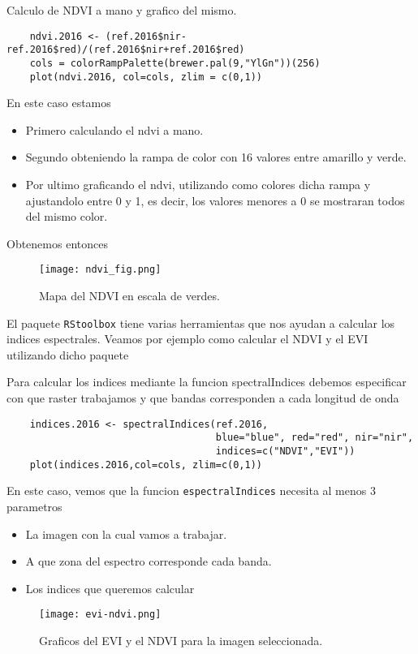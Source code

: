 \begin{exa}
    Calculo de NDVI a mano y grafico del mismo. 
    \begin{lstlisting}
    ndvi.2016 <- (ref.2016$nir-ref.2016$red)/(ref.2016$nir+ref.2016$red)
    cols = colorRampPalette(brewer.pal(9,"YlGn"))(256)
    plot(ndvi.2016, col=cols, zlim = c(0,1))
    \end{lstlisting}
    En este caso estamos
    \begin{itemize}
        \item Primero calculando el ndvi a mano.
        \item Segundo obteniendo la rampa de color con 16 valores entre amarillo
            y verde.
        \item Por ultimo graficando el ndvi, utilizando como colores dicha rampa
            y ajustandolo entre 0 y 1, es decir, los valores menores a 0 se
            mostraran todos del mismo color.
    \end{itemize}
    Obtenemos entonces
    \begin{figure}
    \begin{center}
        \texttt{[image: ndvi\_fig.png]}
    \end{center}
    \caption{Mapa del NDVI en escala de verdes.}
    \label{fig:ndvifig}
    \end{figure}
    
\end{exa}

El paquete \texttt{RStoolbox} tiene varias herramientas que nos ayudan a
calcular los indices espectrales. Veamos por ejemplo como calcular el NDVI y el
EVI utilizando dicho paquete

\begin{exa}
    Para calcular los indices mediante la funcion spectralIndices debemos
    especificar con que raster trabajamos y que bandas corresponden a cada
    longitud de onda
    \begin{lstlisting}
    indices.2016 <- spectralIndices(ref.2016, 
                                    blue="blue", red="red", nir="nir", 
                                    indices=c("NDVI","EVI"))
    plot(indices.2016,col=cols, zlim=c(0,1))
    \end{lstlisting}
    En este caso, vemos que la funcion \texttt{espectralIndices} necesita al
    menos 3 parametros
    \begin{itemize}
        \item La imagen con la cual vamos a trabajar.
        \item A que zona del espectro corresponde cada banda.
        \item Los indices que queremos calcular
    \end{itemize}
     \begin{figure}
     \begin{center}
         \texttt{[image: evi-ndvi.png]}
     \end{center}
     \caption{Graficos del EVI y el NDVI para la imagen seleccionada.}
     \label{fig:evi-ndvi}
     \end{figure}
     
\end{exa}

